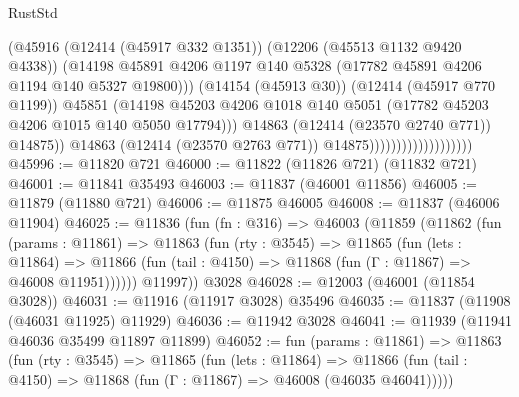 \begin{lexlean}{RustStd}
\begin{coremodule}
{\begin{coremodule}
{{{{{{{{{{{{{{{{{{{{{{{{{{{{{{{{{{{{{{{{{{{{{{{{{{                                                (@45916
                                                  (@12414 (@45917 @332 @1351))
                                                  (@12206 (@45513 @1132 @9420 @4338))
                                                  (@14198
                                                    @45891
                                                    @4206
                                                    @1197
                                                    @140
                                                    @5328
                                                    (@17782 @45891 @4206 @1194 @140 @5327 @19800)))
                                                (@14154 (@45913 @30))
                                                (@12414 (@45917 @770 @1199))
                                                @45851
                                                (@14198
                                                  @45203
                                                  @4206
                                                  @1018
                                                  @140
                                                  @5051
                                                  (@17782 @45203 @4206 @1015 @140 @5050 @17794)))
                                              @14863
                                              (@12414 (@23570 @2740 @771))
                                              @14875))
                                          @14863
                                          (@12414 (@23570 @2763 @771))
                                          @14875)))))))))))))))))))
@45996 := @11820 @721
@46000 := @11822 (@11826 @721) (@11832 @721)
@46001 := @11841 @35493
@46003 := @11837 (@46001 @11856)
@46005 := @11879 (@11880 @721)
@46006 := @11875 @46005
@46008 := @11837 (@46006 @11904)
@46025 := @11836
    (fun (fn : @316) =>
    @46003
      (@11859
        (@11862
          (fun (params : @11861) =>
          @11863
            (fun (rty : @3545) =>
            @11865
              (fun (lets : @11864) =>
              @11866 (fun (tail : @4150) => @11868 (fun (Γ : @11867) => @46008 @11951))))))
        @11997))
    @3028
@46028 := @12003 (@46001 (@11854 @3028))
@46031 := @11916 (@11917 @3028) @35496
@46035 := @11837 (@11908 (@46031 @11925) @11929)
@46036 := @11942 @3028
@46041 := @11939 (@11941 @46036 @35499 @11897 @11899)
@46052 := fun (params : @11861) =>
  @11863
    (fun (rty : @3545) =>
    @11865
      (fun (lets : @11864) =>
      @11866 (fun (tail : @4150) => @11868 (fun (Γ : @11867) => @46008 (@46035 @46041)))))
}}}}}}}}}}}}}}}}}}}}}}}}}}}}}}}}}}}}}}}}}}}}}}}}}}
\end{coremodule}}
\end{coremodule}
\end{lexlean}
